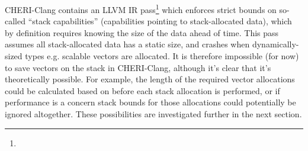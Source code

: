 \documentclass[../thesis]{subfiles}
\begin{document}
CHERI-Clang contains an LLVM IR pass\footnote{} which enforces strict bounds on so-called ``stack capabilities'' (capabilities pointing to stack-allocated data), which by definition requires knowing the size of the data ahead of time.
This pass assumes all stack-allocated data has a static size, and crashes when dynamically-sized types e.g. scalable vectors are allocated.
It is therefore impossible (for now) to save vectors on the stack in CHERI-Clang, although it's clear that it's theoretically possible.
For example, the length of the required vector allocations could be calculated based on  before each stack allocation is performed, or if performance is a concern stack bounds for those allocations could potentially be ignored altogether.
These possibilities are investigated further in the next section.

\pagebreak


\end{document}
